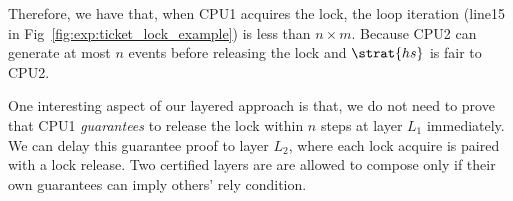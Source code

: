 Therefore, we have that, when CPU1 acquires the lock,
the loop iteration (\cf line15 in Fig~\ref{fig:exp:ticket_lock_example})
is less than $n \times m$.
Because CPU2 can generate at most $n$
events before releasing the lock
and $\strat{hs}$ is fair to CPU2.

One interesting aspect of our layered approach is that,
we do not need to prove that CPU1
 \emph{guarantees} to release the lock within $n$ steps at layer $L_1$ immediately.  
 We can delay this guarantee proof to layer $L_2$,
 where each lock acquire is paired with a lock release.
 Two certified layers are are allowed to compose 
 only if their own guarantees can imply 
 others' rely condition.

